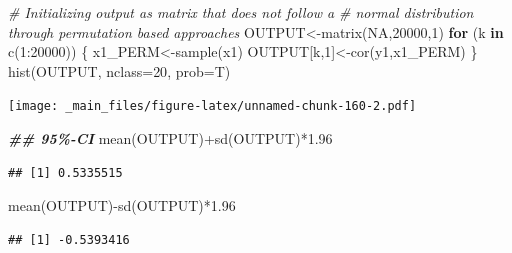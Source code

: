 \documentclass[
  notitlepage,
  onecolumn,
  openany]{book}
\newenvironment{Shaded}{\begin{snugshade}}{\end{snugshade}}
\newcommand{\AttributeTok}[1]{\textcolor[rgb]{0.77,0.63,0.00}{#1}}
\newcommand{\CommentTok}[1]{\textcolor[rgb]{0.56,0.35,0.01}{\textit{#1}}}
\newcommand{\ConstantTok}[1]{\textcolor[rgb]{0.00,0.00,0.00}{#1}}
\newcommand{\ControlFlowTok}[1]{\textcolor[rgb]{0.13,0.29,0.53}{\textbf{#1}}}
\newcommand{\DecValTok}[1]{\textcolor[rgb]{0.00,0.00,0.81}{#1}}
\newcommand{\DocumentationTok}[1]{\textcolor[rgb]{0.56,0.35,0.01}{\textbf{\textit{#1}}}}
\newcommand{\FloatTok}[1]{\textcolor[rgb]{0.00,0.00,0.81}{#1}}
\newcommand{\FunctionTok}[1]{\textcolor[rgb]{0.00,0.00,0.00}{#1}}
\newcommand{\NormalTok}[1]{#1}
\newcommand{\OtherTok}[1]{\textcolor[rgb]{0.56,0.35,0.01}{#1}}
\newcommand{\SpecialCharTok}[1]{\textcolor[rgb]{0.00,0.00,0.00}{#1}}
\begin{document}
\begin{Shaded}
\begin{Highlighting}[]
\CommentTok{\# Initializing output as matrix that does not follow a }
\CommentTok{\# normal distribution through permutation based approaches}
\NormalTok{OUTPUT}\OtherTok{\textless{}{-}}\FunctionTok{matrix}\NormalTok{(}\ConstantTok{NA}\NormalTok{,}\DecValTok{20000}\NormalTok{,}\DecValTok{1}\NormalTok{)}
\ControlFlowTok{for}\NormalTok{ (k }\ControlFlowTok{in} \FunctionTok{c}\NormalTok{(}\DecValTok{1}\SpecialCharTok{:}\DecValTok{20000}\NormalTok{))}
\NormalTok{\{}
\NormalTok{  x1\_PERM}\OtherTok{\textless{}{-}}\FunctionTok{sample}\NormalTok{(x1)}
\NormalTok{  OUTPUT[k,}\DecValTok{1}\NormalTok{]}\OtherTok{\textless{}{-}}\FunctionTok{cor}\NormalTok{(y1,x1\_PERM)}
\NormalTok{\}}
\FunctionTok{hist}\NormalTok{(OUTPUT, }\AttributeTok{nclass=}\DecValTok{20}\NormalTok{, }\AttributeTok{prob=}\NormalTok{T)}
\end{Highlighting}
\end{Shaded}

\texttt{[image: \_main\_files/figure-latex/unnamed-chunk-160-2.pdf]}

\begin{Shaded}
\begin{Highlighting}[]
\DocumentationTok{\#\# 95\%{-}CI}
\FunctionTok{mean}\NormalTok{(OUTPUT)}\SpecialCharTok{+}\FunctionTok{sd}\NormalTok{(OUTPUT)}\SpecialCharTok{*}\FloatTok{1.96}
\end{Highlighting}
\end{Shaded}

\begin{verbatim}
## [1] 0.5335515
\end{verbatim}

\begin{Shaded}
\begin{Highlighting}[]
\FunctionTok{mean}\NormalTok{(OUTPUT)}\SpecialCharTok{{-}}\FunctionTok{sd}\NormalTok{(OUTPUT)}\SpecialCharTok{*}\FloatTok{1.96}
\end{Highlighting}
\end{Shaded}

\begin{verbatim}
## [1] -0.5393416
\end{verbatim}
\end{document}
